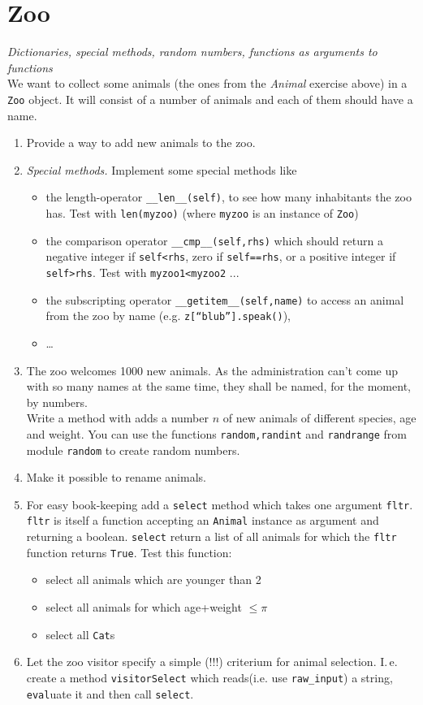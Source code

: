 \documentclass[12pt]{scrartcl}
\begin{document}
\section{Zoo}
\textit{Dictionaries, special methods, random numbers, functions as arguments
  to functions}\\
We want to collect some animals (the ones from the \emph{Animal} exercise
above) in a \texttt{Zoo} object. It will consist of a
number of animals and each of them should have a name. 
\begin{enumerate}
\item Provide a way to add new animals to the zoo. 
\item \emph{Special methods.} Implement some special methods like
\begin{itemize}
\item the length-operator \texttt{\_\_len\_\_(self)}, to see how many inhabitants the zoo has. Test with \texttt{len(myzoo)} (where \texttt{myzoo} is an instance of \texttt{Zoo})
\item the comparison operator \texttt{\_\_cmp\_\_(self,rhs)} which should return a negative integer if \texttt{self<rhs}, zero if \texttt{self==rhs}, or a positive integer if \texttt{self>rhs}. Test with \texttt{myzoo1<myzoo2} ...
\item the subscripting operator \texttt{\_\_getitem\_\_(self,name)} to access an animal from the zoo by name (e.g. \texttt{z[``blub''].speak()}),
\item \dots
\end{itemize}

\item The zoo welcomes 1000 new animals. As the administration can't come up
  with so many names at the same time, they shall be named, for the moment, by
  numbers. \\
  Write a method with adds a number $n$ of new animals of different species, age
  and weight. You can use the functions  \texttt{random,randint} and
  \texttt{randrange} from module \texttt{random} to create random numbers.
\item Make it possible to rename animals.
\item For easy book-keeping add a \texttt{select} method which takes one
  argument \texttt{fltr}. \texttt{fltr} is itself a function accepting an
  \texttt{Animal} instance as argument and returning a
  boolean. \texttt{select} return a list of all animals for which the
  \texttt{fltr} function returns \texttt{True}. Test this function:
  \begin{itemize}
  \item select all animals which are younger than 2
  \item select all animals for which age+weight $\leq \pi$
  \item select all \texttt{Cat}s
  \end{itemize}
\item Let the zoo visitor specify a simple (!!!) criterium for animal
  selection. I.\,e. create a method \texttt{visitorSelect} which
  reads(i.e. use \texttt{raw\_input}) a string, \texttt{eval}uate it and then call
  \texttt{select}. 

\end{enumerate}
\end{document}
